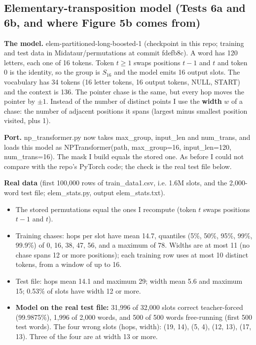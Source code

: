 \documentclass[paper=a4,fontsize=11pt,DIV=11,parskip=half,headings=small,numbers=noendperiod]{scrartcl}
\DeclareRobustCommand{\lead}[1]{\textsf{\bfseries\color{accent}#1}}
\DeclareRobustCommand{\code}[1]{{\fontseries{m}\ttfamily #1}}
\begin{document}
\subsection{Elementary-transposition model (Tests 6a and 6b, and where Figure 5b comes from)}\label{sec:3.8}
\lead{The model.} \code{elem-\allowbreak{}partitioned-\allowbreak{}long-\allowbreak{}boosted-\allowbreak{}1}
(checkpoint in this repo; training and test data in \code{Midataur/\allowbreak{}permutations} at commit
\code{fdefb8c}). A word has 120 letters, each one of 16 tokens. Token $t\ge1$ swaps positions $t-1$ and $t$ and
token 0 is the identity, so the group is $S_{16}$ and the model emits 16 output slots. The vocabulary has 34
tokens (16 letter tokens, 16 output tokens, NULL, START) and the context is 136. The pointer chase is the same,
but every hop moves the pointer by $\pm1$. Instead of the number of distinct points I use the \textbf{width} $w$
of a chase: the number of adjacent positions it spans (largest minus smallest position visited, plus 1).

\lead{Port.} \code{np\_\allowbreak{}transformer.\allowbreak{}py} now takes \code{max\_\allowbreak{}group},
\code{input\_\allowbreak{}len} and \code{num\_\allowbreak{}trans}, and loads this model as
\code{NPTransformer(path, max\_\allowbreak{}group=\allowbreak{}16, input\_\allowbreak{}len=\allowbreak{}120,
num\_\allowbreak{}trans=\allowbreak{}16)}. The mask I build equals the stored one. As before I could not compare
with the repo’s PyTorch code; the check is the real test file below.

\lead{Real data} (first 100,000 rows of \code{train\_\allowbreak{}data1.\allowbreak{}csv}, i.e. 1.6M slots, and
the 2,000-word test file; \code{elem\_\allowbreak{}stats.\allowbreak{}py}, output
\code{elem\_\allowbreak{}stats.\allowbreak{}txt}).

\begin{itemize}
\item The stored permutations equal the ones I recompute (token $t$ swaps positions $t-1$ and $t$).
\item Training chases: hops per slot have mean 14.7, quantiles (5\%, 50\%, 95\%, 99\%, 99.9\%) of 0, 16, 38, 47,
  56, and a maximum of 78. Widths are at most 11 (no chase spans 12 or more positions); each training row uses
  at most 10 distinct tokens, from a window of up to 16.
\item Test file: hops mean 14.1 and maximum 29; width mean 5.6 and maximum 15; 0.53\% of slots have width 12 or
  more.
\item \lead{Model on the real test file:} 31,996 of 32,000 slots correct teacher-forced (99.9875\%), 1,996 of
  2,000 words, and 500 of 500 words free-running (first 500 test words). The four wrong slots (hops, width):
  (19, 14), (5, 4), (12, 13), (17, 13). Three of the four are at width 13 or more.
\end{itemize}
\end{document}
